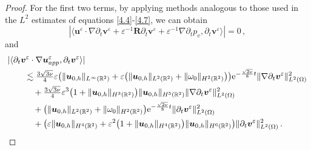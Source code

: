 \documentclass[pdflatex,sn-mathphys-num]{sn-jnl}%
\theoremstyle{thmstyleone}%
\theoremstyle{thmstyletwo}%
\theoremstyle{thmstylethree}%
\theoremstyle{thmstyletwo}
\begin{document}
\begin{proof}
	
	For the first two terms, by applying methods analogous to those used in the $L^2$ estimates of equations \eqref{4.4}-\eqref{4.7}, we can obtain
	\begin{equation}\label{3.2.1}
		|\langle{\boldsymbol u}^{\varepsilon} \cdot \nabla \partial_t{\boldsymbol v}^{\varepsilon}
		+	{\varepsilon}^{-1}\boldsymbol{R}
		\partial_t\boldsymbol v^{\varepsilon}
		+		{\varepsilon}^{-1}\nabla \partial_t p_v,\partial_t{\boldsymbol v}^{\varepsilon}\rangle|=0\,,
	\end{equation}
	and
	\begin{align}\label{3.3.1}
		&|\langle
		\partial_t{\boldsymbol v}^{\varepsilon}\cdot
		\nabla\boldsymbol{u}^{\varepsilon}_{app},
		\partial_t{\boldsymbol v}^{\varepsilon}
		\rangle|\notag\\
		&\qquad\lesssim
		\tfrac{3\sqrt{3\nu}}{4}
		\varepsilon
		\big(
		\lVert{\boldsymbol{u}}_{0,h}\rVert_{L^\infty(\mathbb{R}^2)} 
		+\varepsilon\big(
		\lVert{\boldsymbol{u}}_{0,h}\rVert_{L^2(\mathbb{R}^2)}+\lVert{\omega}_0\rVert_{H^2(\mathbb{R}^2)}
		\big)
		\big)\mathrm{e}^{-\frac{\sqrt{2\nu}}{8}  t}
		\lVert\nabla\partial_t{\boldsymbol v}^{\varepsilon}\rVert^2_{{L}^2(\Omega)}
		\notag\\
		&\qquad\quad+\tfrac{3\sqrt{3\nu}}{4}\varepsilon^3
		\big(
		1+
		\lVert {\boldsymbol{u}}_{0,h} \rVert_{H^{3}(\mathbb{R}^2)}
		\big)
		\lVert {\boldsymbol{u}}_{0,h} \rVert_{H^{5}(\mathbb{R}^2)}
		\lVert\nabla\partial_t{\boldsymbol v}^{\varepsilon}\rVert^2_{{L}^2(\Omega)}\notag\\
		&\qquad\quad+
		\big(
		\lVert{\boldsymbol{u}}_{0,h}\rVert_{L^2(\mathbb{R}^2)}+\lVert{\omega}_0\rVert_{H^2(\mathbb{R}^2)}
		\big)\mathrm{e}^{-\frac{\sqrt{2\nu}}{8}  t}\lVert \partial_t{\boldsymbol v}^{\varepsilon} \rVert^2_{{L}^2(\Omega)}
		\notag\\
		&\qquad\quad+\big(\varepsilon
		\lVert {\boldsymbol{u}}_{0,h} \rVert_{H^{4}(\mathbb{R}^2)}
		+\varepsilon^2
		\big(
		1+
		\lVert {\boldsymbol{u}}_{0,h} \rVert_{H^{4}(\mathbb{R}^2)}
		\big)
		\lVert {\boldsymbol{u}}_{0,h} \rVert_{H^{6}(\mathbb{R}^2)}\big)\lVert\partial_t {\boldsymbol v}^{\varepsilon} \rVert^2_{{L}^2(\Omega)}\,.
	\end{align}
	

\end{proof}
\end{document}
